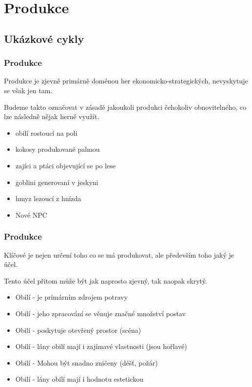 ﻿\documentclass[a4paper]{beamer}
\begin{document}
\section{Produkce}

\subsection{Ukázkové cykly}



\begin{frame}
\frametitle{Produkce}

Produkce je zjevně primárně doménou her ekonomicko-strategických, nevyskytuje se však jen tam. 

\vfill
Budeme takto označovat v zásadě jakoukoli produkci čehokoliv obnovitelného, co lze následně nějak herně využít.

\begin{itemize}
    \item obilí rostoucí na poli
    \item kokosy produkované palmou
    \item zajíci a ptáci objevující se po lese
    \item goblini generovaní v jeskyni
    \item hmyz lezoucí z hnízda
    \item Nové NPC 
\end{itemize}
\end{frame}

\begin{frame}
\frametitle{Produkce}

Klíčové je nejen určení toho co se má produkovat, ale především toho jaký je účel.

\vfill
Tento účel přitom může být jak naprosto zjevný, tak naopak skrytý.

\begin{itemize}
    \item Obilí - je primárním zdrojem potravy
    \item Obilí - jeho zpracování se věnuje značné množství postav
    \item Obilí - poskytuje otevřený prostor (scéna)
    \item Obilí - lány obilí mají i zajímavé vlastnosti (jsou hořlavé)
    \item Obilí - Mohou být snadno zničeny (déšť, požár)
    \item Obilí - lány obilí mají i hodnotu estetickou
\end{itemize}
\end{frame}
\end{document}

